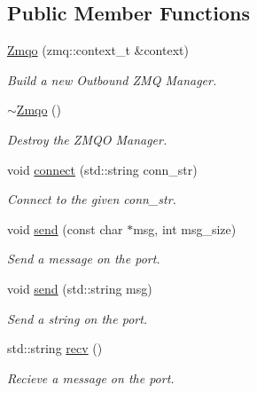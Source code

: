 \subsection*{Public Member Functions}
\begin{DoxyCompactItemize}
\item 
\hypertarget{classZmqo_a1572f05607e0ec993e3409dbce857f4f}{\hyperlink{classZmqo_a1572f05607e0ec993e3409dbce857f4f}{Zmqo} (zmq\-::context\-\_\-t \&context)}\label{classZmqo_a1572f05607e0ec993e3409dbce857f4f}

\begin{DoxyCompactList}\small\item\em Build a new Outbound Z\-M\-Q Manager. \end{DoxyCompactList}\item 
\hypertarget{classZmqo_a72472d8a881f468c06da8c0f23e80494}{\hyperlink{classZmqo_a72472d8a881f468c06da8c0f23e80494}{$\sim$\-Zmqo} ()}\label{classZmqo_a72472d8a881f468c06da8c0f23e80494}

\begin{DoxyCompactList}\small\item\em Destroy the Z\-M\-Q\-O Manager. \end{DoxyCompactList}\item 
\hypertarget{classZmqo_aa81909a34c542dd66d0079400ad3f3e9}{void \hyperlink{classZmqo_aa81909a34c542dd66d0079400ad3f3e9}{connect} (std\-::string conn\-\_\-str)}\label{classZmqo_aa81909a34c542dd66d0079400ad3f3e9}

\begin{DoxyCompactList}\small\item\em Connect to the given conn\-\_\-str. \end{DoxyCompactList}\item 
\hypertarget{classZmqo_a8142cd31df8cc0d75a617dc9ae84ff37}{void \hyperlink{classZmqo_a8142cd31df8cc0d75a617dc9ae84ff37}{send} (const char $\ast$msg, int msg\-\_\-size)}\label{classZmqo_a8142cd31df8cc0d75a617dc9ae84ff37}

\begin{DoxyCompactList}\small\item\em Send a message on the port. \end{DoxyCompactList}\item 
\hypertarget{classZmqo_ae5184a9dfc2017f3c9d62bd51c457f53}{void \hyperlink{classZmqo_ae5184a9dfc2017f3c9d62bd51c457f53}{send} (std\-::string msg)}\label{classZmqo_ae5184a9dfc2017f3c9d62bd51c457f53}

\begin{DoxyCompactList}\small\item\em Send a string on the port. \end{DoxyCompactList}\item 
\hypertarget{classZmqo_afdf8372877361a581595ccb4983f8110}{std\-::string \hyperlink{classZmqo_afdf8372877361a581595ccb4983f8110}{recv} ()}\label{classZmqo_afdf8372877361a581595ccb4983f8110}

\begin{DoxyCompactList}\small\item\em Recieve a message on the port. \end{DoxyCompactList}\end{DoxyCompactItemize}


